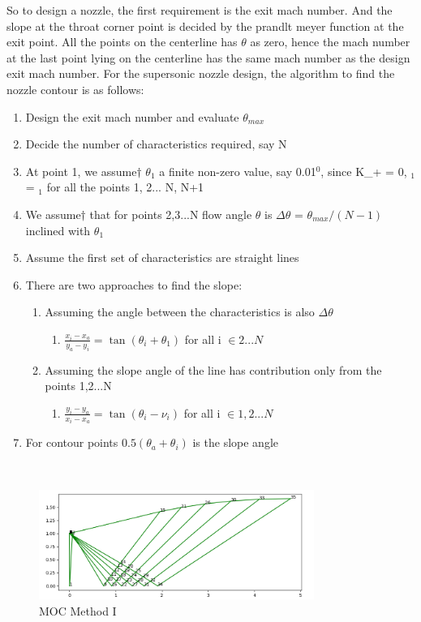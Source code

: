 So to design a nozzle, the first requirement is the exit mach number. And the slope at the throat corner point is decided by the prandlt meyer function at the exit point. All the points on the centerline has $\theta$ as zero, hence the mach number at the last point lying on the centerline has the same mach number as the design exit mach number. For the supersonic nozzle design, the algorithm to find the nozzle contour is as follows:
\begin{enumerate}
\setlength\itemsep{0.01em}
    \item Design the exit mach number and evaluate $\theta_{max}$
    \item Decide the number of characteristics required, say N
    \item At point 1, we assume$\dag$ $\theta_1$ a finite non-zero value, say 0.01$^0$, since K_+ = 0, \theta$_1$ = \nu$_1$ for all the points 1, 2... N, N+1
    \item We assume$\dag$  that for points 2,3...N flow angle $\theta$ is $\Delta\theta$ = $\theta_{max}/(N-1)$ inclined with $\theta_1$
    \item Assume the first set of characteristics are straight lines
    \item There are two approaches to find the slope:
    \begin{enumerate}
        \item Assuming the angle between the characteristics is also $\Delta\theta$
        \begin{enumerate}
            \item $\frac{x_i - x_a}{y_a - y_i} = \tan(\theta_i+\theta_1)$ for all i $\in {2...N}$    
        \end{enumerate}
        \item Assuming the slope angle of the line has contribution only from the points 1,2...N
        \begin{enumerate}
            \item $\frac{y_i - y_a}{x_i - x_a} = \tan(\theta_i - \nu_i )$ for all i $\in {1,2...N} $
        \end{enumerate}
    \end{enumerate}
    \item For contour points $0.5(\theta_a + \theta_i)$ is the slope angle
\end{enumerate}\\

\begin{figure}[H]
    \centering
    \includegraphics[width=0.8\textwidth]{text/MoC_Anderson.PNG}
    \caption[MOC Method I]{MOC Method I}
    \label{fig:MOC Method I}
\end{figure}

